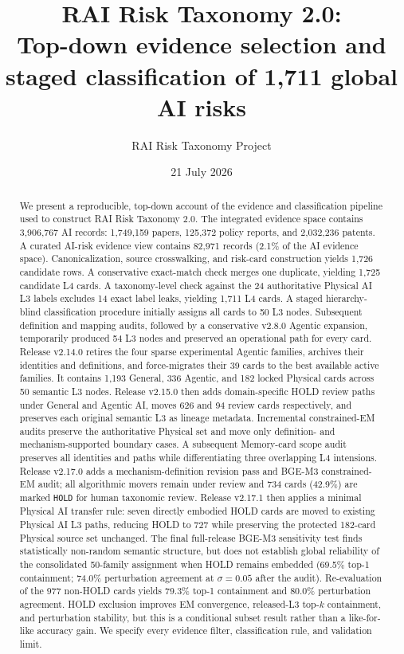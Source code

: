 \documentclass[11pt,a4paper]{article}
\title{\vspace{-1.3cm}\bfseries\Large RAI Risk Taxonomy 2.0:\\[3pt]
Top-down evidence selection and staged classification of 1,711 global AI risks}
\author{RAI Risk Taxonomy Project}
\date{21 July 2026}
\newcommand{\code}[1]{\texttt{#1}}
\begin{document}
\maketitle

\begin{abstract}
We present a reproducible, top-down account of the evidence and classification
pipeline used to construct RAI Risk Taxonomy 2.0. The integrated evidence space
contains 3,906,767 AI records: 1,749,159 papers, 125,372 policy reports, and
2,032,236 patents. A curated AI-risk evidence view contains 82,971 records
(2.1\% of the AI evidence space). Canonicalization, source crosswalking, and
risk-card construction yields 1,726 candidate rows. A conservative exact-match
check merges one duplicate, yielding 1,725 candidate L4 cards. A taxonomy-level
check against the 24 authoritative Physical AI L3 labels excludes 14 exact
label leaks, yielding 1,711 L4 cards. A staged hierarchy-blind classification
procedure initially assigns all cards to 50 L3 nodes. Subsequent definition and
mapping audits, followed by a conservative v2.8.0 Agentic expansion, temporarily
produced 54 L3 nodes and preserved an operational path for every card. Release
v2.14.0 retires the four sparse experimental Agentic families, archives their
identities and definitions, and force-migrates their 39 cards to the best
available active families. It contains 1,193 General, 336 Agentic, and 182
locked Physical cards across 50 semantic L3 nodes. Release v2.15.0 then adds
domain-specific HOLD review paths under General and Agentic AI, moves 626 and
94 review cards respectively, and preserves each original semantic L3 as
lineage metadata. Incremental
constrained-EM audits preserve the authoritative Physical set and move only
definition- and mechanism-supported boundary cases. A subsequent Memory-card
scope audit preserves all identities and paths while differentiating three
overlapping L4 intensions. Release v2.17.0 adds a mechanism-definition
revision pass and BGE-M3 constrained-EM audit; all algorithmic movers remain
under review and 734 cards (42.9\%) are marked \code{HOLD} for human taxonomic
review. Release v2.17.1 then applies a minimal Physical AI transfer rule:
seven directly embodied HOLD cards are moved to existing Physical AI L3 paths,
reducing HOLD to 727 while preserving the protected 182-card Physical source
set unchanged. The final full-release BGE-M3 sensitivity test finds statistically
non-random semantic structure, but does not establish global reliability of the
consolidated 50-family assignment when HOLD remains embedded (69.5\% top-1
containment; 74.0\% perturbation agreement at $\sigma=0.05$ after the audit).
Re-evaluation of the 977 non-HOLD cards yields 79.3\% top-1 containment and
80.0\% perturbation agreement. HOLD exclusion improves EM convergence,
released-L3 top-$k$ containment, and perturbation stability, but this is a
conditional subset result rather than a like-for-like accuracy gain. We specify
every evidence filter, classification rule, and validation limit.
\end{abstract}
\end{document}
